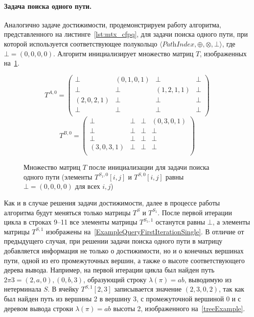 \paragraph{Задача поиска одного пути.} Аналогично задаче достижимости, продемонстрируем работу алгоритма, представленного на листинге~\ref{lst:mtx_cfpq}, для задачи поиска одного пути, при которой используется соответствующее полукольцо $\langle \textit{PathIndex}, \oplus, \otimes, \bot \rangle$, где $\bot = (0, 0, 0, 0)$. Алгоритм инициализирует множество матриц $T$, изображенных на~\cref{ExampleQueryInitMatrixSingle}.

{\footnotesize
\begin{figure}[h]
	\[
	T^{A, 0} = \begin{pmatrix}
	\bot & (0, 1, 0, 1)       & \bot & \bot       \\
	\bot & \bot & (1, 2, 1, 1)       & \bot \\
	(2, 0, 2, 1)       & \bot & \bot & \bot \\
	\bot       & \bot & \bot & \bot \\
	\end{pmatrix}
	\]
	\[
	T^{B, 0} = \begin{pmatrix}
	\bot & \bot       & \bot & (0, 3, 0, 1)       \\
	\bot & \bot & \bot       & \bot \\
	\bot       & \bot & \bot & \bot \\
	(3, 0, 3, 1)      & \bot & \bot & \bot \\
	\end{pmatrix}
	\]
	\caption{Множество матриц $T$ после инициализации для задачи поиска одного пути (элементы $T^{S_1, 0}[i, j]$ и $T^{S, 0}[i, j]$ равны $\bot = (0, 0, 0, 0)$ для всех $i, j$)}
	\label{ExampleQueryInitMatrixSingle}
\end{figure}
}

Как и в случае решения задачи достижимости, далее в процессе работы алгоритма будут меняться только матрицы $T^{S}$ и $T^{S_1}$. После первой итерации цикла в строках 9--11 все элементы матрицы $T^{S_1, 1}$ останутся равны $\bot$, а элементы матрицы $T^{S, 1}$ изображены на~\cref{ExampleQueryFirstIterationSingle}. В отличие от предыдущего случая, при решении задачи поиска одного пути в матрицу добавляется информация не только о достижимости, но и о конечных вершинах пути, одной из его промежуточных вершин, а также о высоте соответствующего дерева вывода. Например, на первой итерации цикла был найден путь $2 \pi 3 = (2, a, 0), (0, b, 3)$, образующий строку $\lambda(\pi) = ab$, выводимую из нетерминала $S$. В ячейку $T^{S, 1}[2, 3]$ записывается значение $(2, 3, 0, 2)$, так как был найден путь из вершины 2 в вершину 3, с промежуточной вершиной 0 и с деревом вывода строки $\lambda(\pi) = ab$ высоты 2, изображенного на~\cref{treeExample}.

